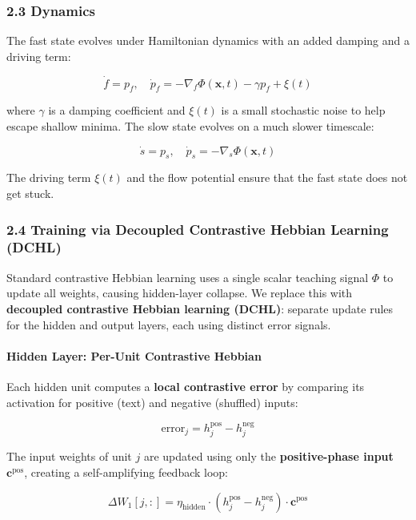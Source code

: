 \documentclass[
  11pt,
  a4paper,
]{article}
\begin{document}
\subsubsection{2.3 Dynamics}\label{dynamics}

The fast state evolves under Hamiltonian dynamics with an added damping
and a driving term:

\[
\dot{f} = p_f, \quad \dot{p}_f = -\nabla_f \Phi(\mathbf{x}, t) - \gamma p_f + \xi(t)
\]

where \(\gamma\) is a damping coefficient and \(\xi(t)\) is a small
stochastic noise to help escape shallow minima. The slow state evolves
on a much slower timescale:

\[
\dot{s} = p_s, \quad \dot{p}_s = -\nabla_s \Phi(\mathbf{x}, t)
\]

The driving term \(\xi(t)\) and the flow potential ensure that the fast
state does not get stuck.

\subsubsection{2.4 Training via Decoupled Contrastive Hebbian Learning
(DCHL)}\label{training-via-decoupled-contrastive-hebbian-learning-dchl}

Standard contrastive Hebbian learning uses a single scalar teaching
signal \(\Phi\) to update all weights, causing hidden-layer collapse. We
replace this with \textbf{decoupled contrastive Hebbian learning
(DCHL)}: separate update rules for the hidden and output layers, each
using distinct error signals.

\paragraph{Hidden Layer: Per-Unit Contrastive
Hebbian}\label{hidden-layer-per-unit-contrastive-hebbian}

Each hidden unit computes a \textbf{local contrastive error} by
comparing its activation for positive (text) and negative (shuffled)
inputs:

\[
\text{error}_j = h_j^{\text{pos}} - h_j^{\text{neg}}
\]

The input weights of unit \(j\) are updated using only the
\textbf{positive-phase input} \(\mathbf{c}^{\text{pos}}\), creating a
self-amplifying feedback loop:

\[
\Delta W_1[j,:] = \eta_{\text{hidden}} \cdot (h_j^{\text{pos}} - h_j^{\text{neg}}) \cdot \mathbf{c}^{\text{pos}}
\]
\end{document}
